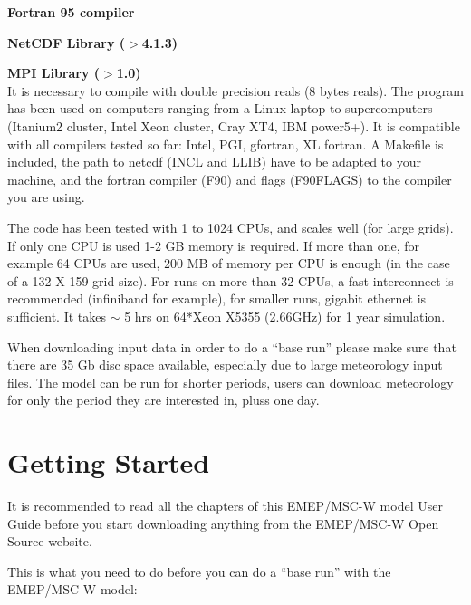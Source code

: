 \documentclass[a4paper,12pt]{report}
\begin{document}
\textbf{Fortran 95 compiler}

\textbf{NetCDF Library ($>$4.1.3)}

\textbf{MPI Library ($>$1.0)}\\

It is necessary to compile with double precision reals (8 bytes
reals). The program has been used on computers ranging from a Linux laptop to supercomputers 
(Itanium2 cluster, Intel Xeon cluster, Cray XT4, IBM power5+). It is compatible with all 
compilers tested so far:  Intel, PGI, gfortran, XL fortran. A Makefile is included,  
the path to netcdf (INCL and LLIB) have to be adapted to your machine, and the fortran 
compiler (F90) and flags (F90FLAGS) to the compiler you are using.



The code has been tested with 1 to 1024 CPUs, and scales well (for large grids).  If only one 
CPU is used 1-2 GB memory is required. If more than one,
for example 64 CPUs are used, 200 MB of memory per CPU is enough (in
the case of a 132 X 159 grid size). For runs on more than 32 CPUs, a fast interconnect is 
recommended (infiniband for example), for smaller runs, gigabit ethernet is sufficient. 
It takes $\sim$ 5 hrs on 64*Xeon X5355 (2.66GHz) for 1 year simulation.

When downloading input data in order to do a ``base run'' please make
sure that there are 35 Gb disc space available, especially due to
large meteorology input files. The model can be run for shorter periods, users 
can download meteorology for only the period they are interested in, pluss one day. 
 

\section{Getting Started}


It is recommended to read all the chapters of this EMEP/MSC-W model
User Guide before you start downloading anything from the EMEP/MSC-W Open
Source website.



This is what you need to do before you can do a ``base run'' with the 
EMEP/MSC-W model:
\end{document}
